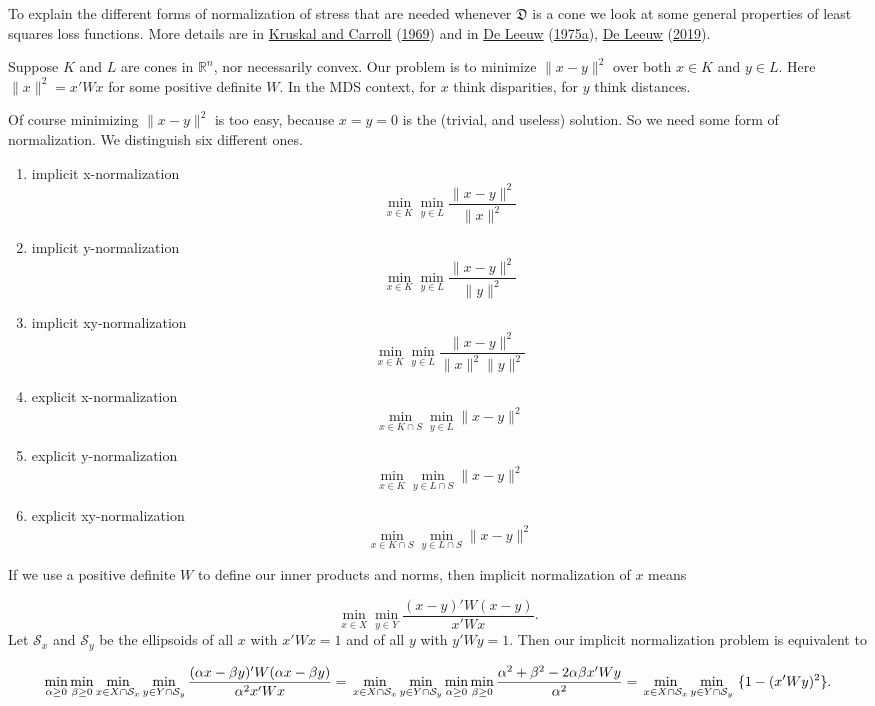 \documentclass[
  12pt,
]{book}
\theoremstyle{definition}
\theoremstyle{definition}
\theoremstyle{definition}
\theoremstyle{definition}
\theoremstyle{remark}
\begin{document}
To explain the different forms of normalization of stress that are
needed whenever \(\mathfrak{D}\) is a cone we look at some general
properties of least squares loss functions. More details are in
\protect\hyperlink{ref-kruskal_carroll_69}{Kruskal and Carroll} (\protect\hyperlink{ref-kruskal_carroll_69}{1969}) and in \protect\hyperlink{ref-deleeuw_U_75a}{De Leeuw} (\protect\hyperlink{ref-deleeuw_U_75a}{1975a}), \protect\hyperlink{ref-deleeuw_E_19d}{De Leeuw} (\protect\hyperlink{ref-deleeuw_E_19d}{2019}).

Suppose \(K\) and \(L\) are cones in \(\mathbb{R}^n\), nor necessarily convex.
Our problem is to minimize \(\|x-y\|^2\) over both \(x\in K\) and
\(y\in L\). Here \(\|x\|^2=x'Wx\) for some positive definite \(W\). In the MDS context, for \(x\) think disparities, for \(y\) think distances.

Of course minimizing \(\|x-y\|^2\) is too easy, because \(x=y=0\) is the
(trivial, and useless) solution. So we need some form of normalization.
We distinguish six different ones.

\begin{enumerate}
\def\labelenumi{\arabic{enumi}.}
\item
  implicit x-normalization
  \[
  \min_{x\in K}\min_{y\in L}\frac{\|x-y\|^2}{\|x\|^2}
  \]
\item
  implicit y-normalization
  \[
  \min_{x\in K}\min_{y\in L}\frac{\|x-y\|^2}{\|y\|^2}
  \]
\item
  implicit xy-normalization
  \[
  \min_{x\in K}\min_{y\in L}\frac{\|x-y\|^2}{\|x\|^2\|y\|^2}
  \]
\item
  explicit x-normalization
  \[
  \min_{x\in K\cap S}\min_{y\in L}\|x-y\|^2
  \]
\item
  explicit y-normalization
  \[
  \min_{x\in K}\min_{y\in L\cap S}\|x-y\|^2
  \]
\item
  explicit xy-normalization
  \[
  \min_{x\in K\cap S}\min_{y\in L\cap S}\|x-y\|^2
  \]
\end{enumerate}

If we use a positive definite \(W\) to define our inner products and norms, then
implicit normalization of \(x\) means

\[
\min_{x\in X}\min_{y\in Y}\frac{(x-y)'W(x-y)}{x'Wx}.
\]
Let \(\mathcal{S}_x\) and \(\mathcal{S}_y\) be the ellipsoids of all \(x\)
with \(x'Wx=1\) and of all \(y\) with \(y'Wy=1\). Then our implicit
normalization problem is equivalent to

\[
\min_{\alpha\geq 0}\min_{\beta\geq 0}\min_{x\in X\cap\mathcal{S}_x}\min_{y\in Y\cap\mathcal{S}_y}\frac{(\alpha x-\beta y)'W(\alpha x-\beta y)}{\alpha^2 x'Wx}=\\\min_{x\in X\cap\mathcal{S}_x}\min_{y\in Y\cap\mathcal{S}_y}\min_{\alpha\geq 0}\min_{\beta\geq 0}\frac{\alpha^2+\beta^2-2\alpha\beta x'Wy}{\alpha^2}=\\
\min_{x\in X\cap\mathcal{S}_x}\min_{y\in Y\cap\mathcal{S}_y}\ \{1-(x'Wy)^2\}.
\]
\end{document}
